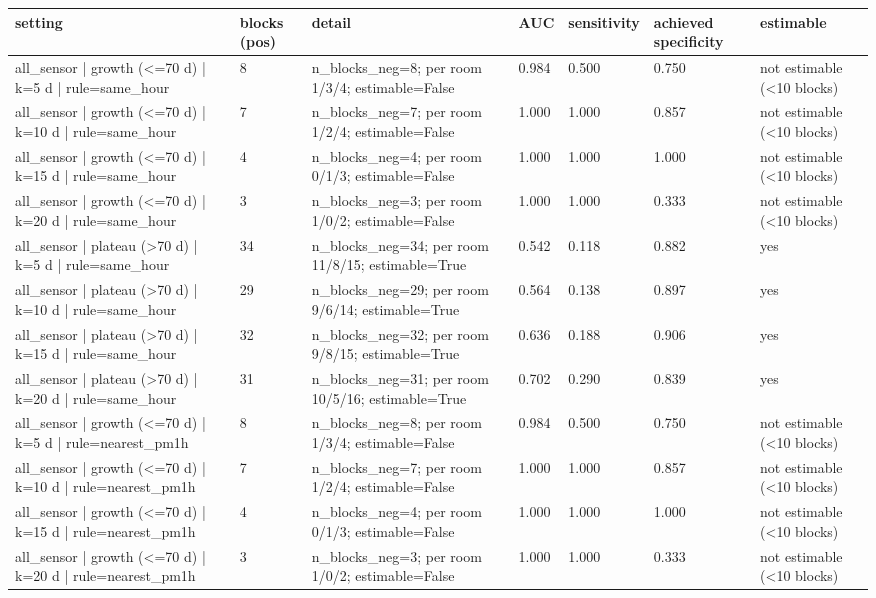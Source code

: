 \begin{tabular}{lllllll}
\hline
setting & blocks (pos) & detail & AUC & sensitivity & achieved specificity & estimable \\
\hline
all\_sensor | growth (<=70 d) | k=5 d | rule=same\_hour & 8 & n\_blocks\_neg=8; per room 1/3/4; estimable=False & 0.984 & 0.500 & 0.750 & not estimable (<10 blocks) \\
all\_sensor | growth (<=70 d) | k=10 d | rule=same\_hour & 7 & n\_blocks\_neg=7; per room 1/2/4; estimable=False & 1.000 & 1.000 & 0.857 & not estimable (<10 blocks) \\
all\_sensor | growth (<=70 d) | k=15 d | rule=same\_hour & 4 & n\_blocks\_neg=4; per room 0/1/3; estimable=False & 1.000 & 1.000 & 1.000 & not estimable (<10 blocks) \\
all\_sensor | growth (<=70 d) | k=20 d | rule=same\_hour & 3 & n\_blocks\_neg=3; per room 1/0/2; estimable=False & 1.000 & 1.000 & 0.333 & not estimable (<10 blocks) \\
all\_sensor | plateau (>70 d) | k=5 d | rule=same\_hour & 34 & n\_blocks\_neg=34; per room 11/8/15; estimable=True & 0.542 & 0.118 & 0.882 & yes \\
all\_sensor | plateau (>70 d) | k=10 d | rule=same\_hour & 29 & n\_blocks\_neg=29; per room 9/6/14; estimable=True & 0.564 & 0.138 & 0.897 & yes \\
all\_sensor | plateau (>70 d) | k=15 d | rule=same\_hour & 32 & n\_blocks\_neg=32; per room 9/8/15; estimable=True & 0.636 & 0.188 & 0.906 & yes \\
all\_sensor | plateau (>70 d) | k=20 d | rule=same\_hour & 31 & n\_blocks\_neg=31; per room 10/5/16; estimable=True & 0.702 & 0.290 & 0.839 & yes \\
all\_sensor | growth (<=70 d) | k=5 d | rule=nearest\_pm1h & 8 & n\_blocks\_neg=8; per room 1/3/4; estimable=False & 0.984 & 0.500 & 0.750 & not estimable (<10 blocks) \\
all\_sensor | growth (<=70 d) | k=10 d | rule=nearest\_pm1h & 7 & n\_blocks\_neg=7; per room 1/2/4; estimable=False & 1.000 & 1.000 & 0.857 & not estimable (<10 blocks) \\
all\_sensor | growth (<=70 d) | k=15 d | rule=nearest\_pm1h & 4 & n\_blocks\_neg=4; per room 0/1/3; estimable=False & 1.000 & 1.000 & 1.000 & not estimable (<10 blocks) \\
all\_sensor | growth (<=70 d) | k=20 d | rule=nearest\_pm1h & 3 & n\_blocks\_neg=3; per room 1/0/2; estimable=False & 1.000 & 1.000 & 0.333 & not estimable (<10 blocks) \\

\end{tabular}
